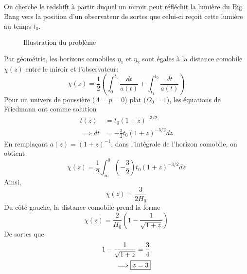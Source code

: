 \documentclass{article}
\numberwithin{equation}{section}
\begin{document}
\subsection{}\label{sec:2a}
On cherche le redshift à partir duquel un miroir peut réfléchit la lumière du Big Bang 
vers la position d'un observateur de sortes que celui-ci reçoit cette lumière au temps 
$t_0$.
\begin{figure}[H]
        \centering
        \caption{Illustration du problème}
        \label{fig:Numero2a}
\end{figure}

Par géométrie, les horizons comobiles $\eta_1$ et $\eta_2$ sont égales à la distance 
comobile $\chi(z)$ entre le miroir et l'observateur:
\[
        \chi(z) = \frac{1}{2} \left( \int_0^{t_1} \frac{dt}{a(t)} 
        + \int_{t_1}^{t_0} \frac{dt}{a(t)}\right)
\]
Pour un univers de poussière ($\Lambda=p=0$) plat ($\Omega_0=1$), les équations de 
Friedmann ont comme solution
\begin{align*}
        t(z) &=  t_0 (1 + z)^{-3/2} \\
        \implies dt &= -\frac{3}{2}t_0 (1 + z)^{-5/2}dz
\end{align*}
En remplaçant $a(z) = (1 + z)^{-1}$, dans l'intégrale de l'horizon comobile, on obtient
\[
        \chi(z) = \frac{1}{2} \int_\infty^{0} \left( - \frac{3}{2} \right)t_0
        (1 + z)^{-3/2} dz
\]
Ainsi,
\[
        \chi(z) = \frac{3}{2H_0}
\]
Du côté gauche, la distance comobile prend la forme
\[
        \chi(z) = \frac{2}{H_0}\left( 1 - \frac{1}{\sqrt{1 + z}} \right)      
\]
De sortes que 
\begin{align*}
        1 - \frac{1}{\sqrt{1 + z}} &=  \frac{3}{4} \\
        \implies \Aboxed{z &= 3} 
\end{align*}
\end{document}
